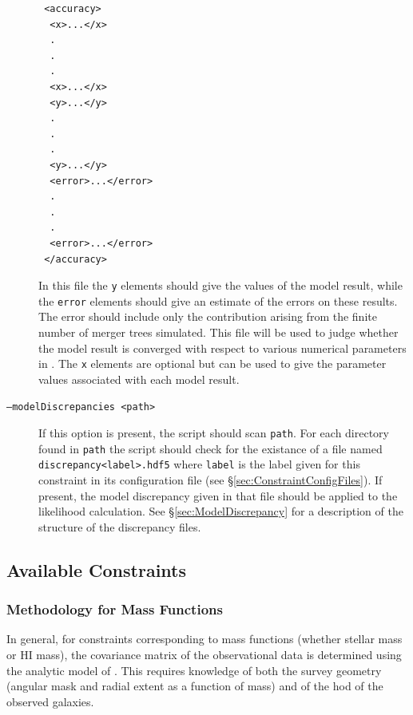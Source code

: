 \begin{description}
\begin{verbatim}
 <accuracy>
  <x>...</x>
  .
  .
  .
  <x>...</x>
  <y>...</y>
  .
  .
  .
  <y>...</y>
  <error>...</error>
  .
  .
  .
  <error>...</error>
 </accuracy>
\end{verbatim}
In this file the {\tt y} elements should give the values of the model result, while the {\tt error} elements should give an estimate of the errors on these results. The error should include only the contribution arising from the finite number of merger trees simulated. This file will be used to judge whether the model result is converged with respect to various numerical parameters in \glc. The {\tt x} elements are optional but can be used to give the parameter values associated with each model result.
 \item [{\tt --modelDiscrepancies <path>}] If this option is present, the script should scan {\tt path}. For each directory found in {\tt path} the script should check for the existance of a file named {\tt discrepancy<label>.hdf5} where {\tt label} is the label given for this constraint in its configuration file (see \S\ref{sec:ConstraintConfigFiles}). If present, the model discrepancy given in that file should be applied to the likelihood calculation. See \S\ref{sec:ModelDiscrepancy} for a description of the structure of the discrepancy files.
\end{description}

\subsection{Available Constraints}

\subsubsection{Methodology for Mass Functions}

In general, for constraints corresponding to mass functions (whether stellar mass or HI mass), the covariance matrix of the observational data is determined using the analytic model of \cite{smith_how_2012}. This requires knowledge of both the survey geometry (angular mask and radial extent as a function of mass) and of the \gls{hod} of the observed galaxies.

